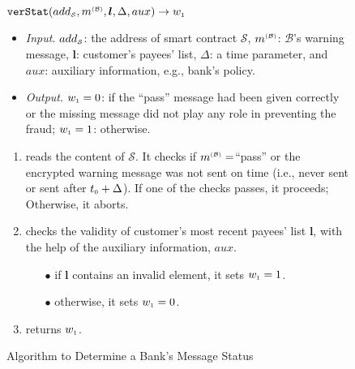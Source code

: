 \begin{figure}[!htbp]
\setlength{\fboxsep}{1pt}
\begin{center}
\begin{boxedminipage}{13.3cm}
\small{
\underline{$\mathtt{verStat}(add_{\scriptscriptstyle\mathcal{S}}, m^{\scriptscriptstyle\mathcal{(B)}},  \bm l, \Delta, aux)\rightarrow w_{\scriptscriptstyle 1}$}\\
%
\begin{itemize}
\item\noindent\textit{Input}. $add_{\scriptscriptstyle\mathcal{S}}$: the address of smart contract $\mathcal{S}$, $m^{\scriptscriptstyle\mathcal{(B)}}$:  $\mathcal{B}$'s warning message,  $\bm l$:  customer's payees' list, $\Delta$: a time parameter, and $aux$: auxiliary information, e.g., bank's policy. 
%
\item\noindent\textit{Output}. $ w_{\scriptscriptstyle 1}=0$: if the ``pass'' message had been given correctly or the missing message did not play any role in preventing the fraud; $ w_{\scriptscriptstyle 1}=1$: otherwise. 
\end{itemize}
\begin{enumerate}
\item reads the content of   $\mathcal{S}$. It checks if $m^{\scriptscriptstyle\mathcal{(B)}}=$``pass''  or the encrypted warning message was not sent on time (i.e., never sent or sent after    $t_{\scriptscriptstyle 0}+\Delta$).  If one of the checks passes, it proceeds; Otherwise, it aborts. 
\item checks the validity of  customer's most recent payees' list $\bm l$, with the help of the auxiliary information, $aux$. 
\begin{itemize}
\item[$\bullet$]  if $\bm l$ contains an invalid element,  it sets $ w_{\scriptscriptstyle 1}=1$.
\item [$\bullet$] otherwise, it sets $ w_{\scriptscriptstyle 1}=0$.
\end{itemize}
\item returns $ w_{\scriptscriptstyle 1}$.
\vspace{1mm}

\end{enumerate}

}
\end{boxedminipage}
\end{center}
\caption{Algorithm to Determine a Bank's Message Status} 
\label{fig:verStat}
\end{figure}
